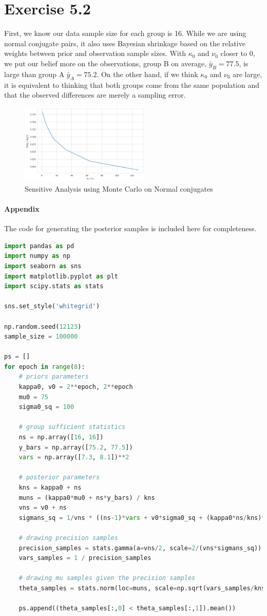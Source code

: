 \documentclass[11pt, letterpaper]{article}
\begin{document}
\section{Exercise 5.2}
First, we know our data sample size for each group is 16. While we are using normal conjugate pairs, it also uses Bayesian shrinkage based on the relative weights between prior and observation sample sizes. With $\kappa_0$ and $\nu_0$ closer to 0, we put our belief more on the observations, group B on average, $\bar{y}_B=77.5$, is large than group A $\bar{y}_A=75.2$. On the other hand, if we think $\kappa_0$ and $\nu_0$ are large, it is equivalent to thinking that both groups come from the same population and that the observed differences are merely a sampling error.
\begin{figure}[!h]
  \centering
  \includegraphics[width=0.55\textwidth]{5.2.a.png}
  \captionsetup{justification=centering}
  \caption{Sensitive Analysis using Monte Carlo on Normal conjugates}
\end{figure}

\paragraph{Appendix}
The code for generating the posterior samples is included here for completeness.
\begin{lstlisting}[language=Python]
import pandas as pd
import numpy as np
import seaborn as sns
import matplotlib.pyplot as plt
import scipy.stats as stats

sns.set_style('whitegrid')

np.random.seed(12123)
sample_size = 100000

ps = []
for epoch in range(8):
    # priors parameters
    kappa0, v0 = 2**epoch, 2**epoch
    mu0 = 75
    sigma0_sq = 100

    # group sufficient statistics
    ns = np.array([16, 16])
    y_bars = np.array([75.2, 77.5])
    vars = np.array([7.3, 8.1])**2

    # posterior parameters
    kns = kappa0 + ns
    muns = (kappa0*mu0 + ns*y_bars) / kns
    vns = v0 + ns
    sigmans_sq = 1/vns * ((ns-1)*vars + v0*sigma0_sq + (kappa0*ns/kns)*(y_bars-mu0)**2)

    # drawing precision samples
    precision_samples = stats.gamma(a=vns/2, scale=2/(vns*sigmans_sq)).rvs(size=(sample_size, 2))
    vars_samples = 1 / precision_samples

    # drawing mu samples given the precision samples
    theta_samples = stats.norm(loc=muns, scale=np.sqrt(vars_samples/kns)).rvs()

    ps.append((theta_samples[:,0] < theta_samples[:,1]).mean())
\end{lstlisting}
\end{document}
